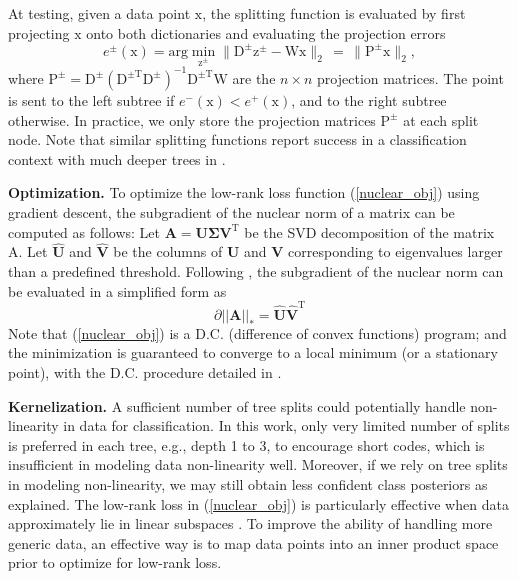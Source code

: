 \documentclass[runningheads]{llncs}
\newcommand{\bb}[1]{\boldsymbol{\mathrm{#1}}}
\newcommand{\Tr}{\mathrm{T}}
\begin{document}
At testing, given a data point $\bb{x}$, the splitting function is evaluated by first projecting $\bb{x}$ onto both dictionaries and evaluating the projection errors
\begin{equation}
e^\pm(\bb{x}) = \mathrm{arg}\min_{\bb{z}^\pm} \| \bb{D}^\pm \bb{z}^\pm - \bb{Wx} \|_2 \, =\,  \| \bb{P}^\pm \bb{x} \|_2,
\end{equation}
where $\bb{P}^\pm = \bb{D}^\pm (\bb{D}^{\pm \Tr} \bb{D}^\pm)^{-1} \bb{D}^{\pm \Tr} \bb{W}$ are the $n \times n$ projection matrices. The point is sent to the left subtree if $e^-(\bb{x}) < e^+(\bb{x})$, and to the right subtree otherwise. In practice, we only store the projection matrices $\bb{P}^\pm$ at each split node.
Note that similar splitting functions report success in a classification context with much deeper trees in \cite{qiu2013learning}.

\textbf{Optimization.}  To optimize the low-rank loss function
(\ref{nuclear_obj}) using gradient descent, the subgradient of the nuclear norm
of a matrix can be computed as follows: Let $\mathbf{A}=\mathbf{U \Sigma
  V}^\mathrm{T}$ be the SVD decomposition of the matrix A. Let
$\mathbf{\hat{U}}$ and $\mathbf{\hat{V}}$ be the columns of $\mathbf{U}$ and
$\mathbf{V}$ corresponding to eigenvalues larger than a predefined threshold.
Following \cite{lowrankT,subdifferential}, the subgradient of the nuclear norm
can be evaluated in a simplified form as
\[
\partial||\mathbf{A}||_* = \mathbf{\hat{U}} \mathbf{\hat{V}} ^\mathrm{T}
\]
Note that (\ref{nuclear_obj}) is a D.C. (difference of convex functions)
program; and the minimization is guaranteed to converge to a local minimum (or a
stationary point), with the D.C. procedure detailed in \cite{dc2,dc1}.

\textbf{Kernelization.}  A sufficient number of tree splits could potentially
handle non-linearity in data for classification. In this work, only very limited
number of splits is preferred in each tree, e.g., depth 1 to 3, to encourage
short codes, which is insufficient in modeling data non-linearity
well. Moreover, if we rely on tree splits in modeling non-linearity, we may
still obtain less confident class posteriors as explained.  The low-rank loss in
(\ref{nuclear_obj}) is particularly effective when data approximately lie in
linear subspaces \cite{lowrankT}.  To improve the ability of handling more
generic data, an effective way is to map data points into an inner product space
prior to optimize for low-rank loss.
\end{document}
